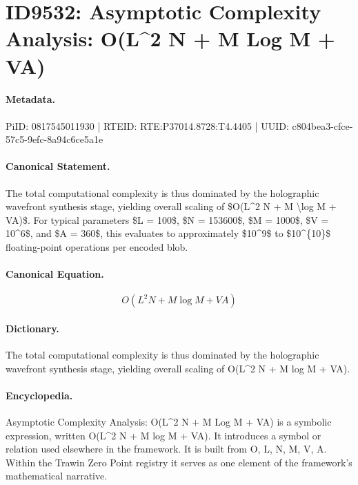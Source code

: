 \section*{ID9532: Asymptotic Complexity Analysis: O(L\textasciicircum{}2 N + M Log M + VA)}
\paragraph{Metadata.}
PiID: 0817545011930 | RTEID: RTE:P37014.8728:T4.4405 | UUID: c804bea3-cfce-57c5-9efc-8a94c6ce5a1e

\paragraph{Canonical Statement.}
The total computational complexity is thus dominated by the holographic wavefront synthesis stage, yielding overall scaling of \$O(L\textasciicircum{}2 N + M \textbackslash{}log M + VA)\$. For typical parameters \$L = 100\$, \$N = 153600\$, \$M = 1000\$, \$V = 10\textasciicircum{}6\$, and \$A = 360\$, this evaluates to approximately \$10\textasciicircum{}9\$ to \$10\textasciicircum{}\{10\}\$ floating-point operations per encoded blob.

\paragraph{Canonical Equation.}
\[
O(L^2 N + M \log M + VA)
\]

\paragraph{Dictionary.}
The total computational complexity is thus dominated by the holographic wavefront synthesis stage, yielding overall scaling of O(L\textasciicircum{}2 N + M log M + VA).

\paragraph{Encyclopedia.}
Asymptotic Complexity Analysis: O(L\textasciicircum{}2 N + M Log M + VA) is a symbolic expression, written O(L\textasciicircum{}2 N + M log M + VA). It introduces a symbol or relation used elsewhere in the framework. It is built from O, L, N, M, V, A. Within the Trawin Zero Point registry it serves as one element of the framework's mathematical narrative.
